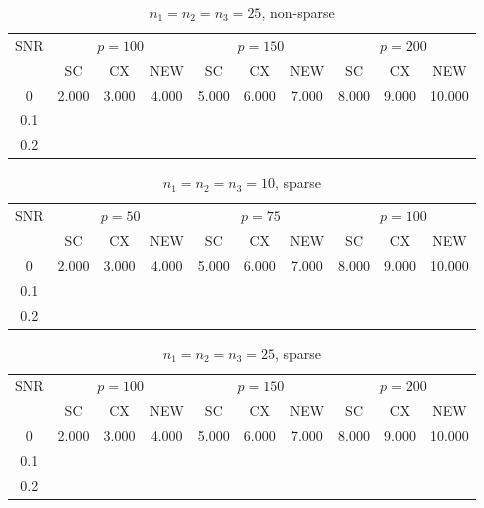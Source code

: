 \documentclass[review]{elsarticle}
\theoremstyle{plain}
\theoremstyle{definition}
\theoremstyle{remark}
\begin{document}
\begin{table}[!hbp]
    \caption[short]{$n_1=n_2=n_3=25$, non-sparse}
    \centering
    \begin{tabular}{*{10}{c}}
    \toprule
    \multirow{2}{*}{SNR} &\multicolumn{3}{c}{$p=100$}&\multicolumn{3}{c}{$p=150$}&\multicolumn{3}{c}{$p=200$} \\
        \cmidrule(r){2-4}\cmidrule(r){5-7}\cmidrule(r){8-10}
        &SC & CX & NEW& SC & CX & NEW &SC & CX & NEW\\
    \midrule
        0& 2.000&3.000&4.000&5.000&6.000&7.000&8.000&9.000&10.000\\
    0.1\\
    0.2\\
    \bottomrule
\end{tabular}
\end{table}

\begin{table}[!hbp]
    \caption[short]{$n_1=n_2=n_3=10$, sparse}
    \centering
    \begin{tabular}{*{10}{c}}
    \toprule
    \multirow{2}{*}{SNR} &\multicolumn{3}{c}{$p=50$}&\multicolumn{3}{c}{$p=75$}&\multicolumn{3}{c}{$p=100$} \\
        \cmidrule(r){2-4}\cmidrule(r){5-7}\cmidrule(r){8-10}
        &SC & CX & NEW& SC & CX & NEW &SC & CX & NEW\\
    \midrule
        0& 2.000&3.000&4.000&5.000&6.000&7.000&8.000&9.000&10.000\\
    0.1\\
    0.2\\
    \bottomrule
\end{tabular}
\end{table}

\begin{table}[!hbp]
    \caption[short]{$n_1=n_2=n_3=25$, sparse}
\begin{center}
    \begin{tabular}{*{10}{c}}
    \toprule
    \multirow{2}{*}{SNR} &\multicolumn{3}{c}{$p=100$}&\multicolumn{3}{c}{$p=150$}&\multicolumn{3}{c}{$p=200$} \\
        \cmidrule(r){2-4}\cmidrule(r){5-7}\cmidrule(r){8-10}
        &SC & CX & NEW& SC & CX & NEW &SC & CX & NEW\\
    \midrule
        0& 2.000&3.000&4.000&5.000&6.000&7.000&8.000&9.000&10.000\\
    0.1\\
    0.2\\
    \bottomrule
\end{tabular}
\end{center}
\end{table}
\end{document}
